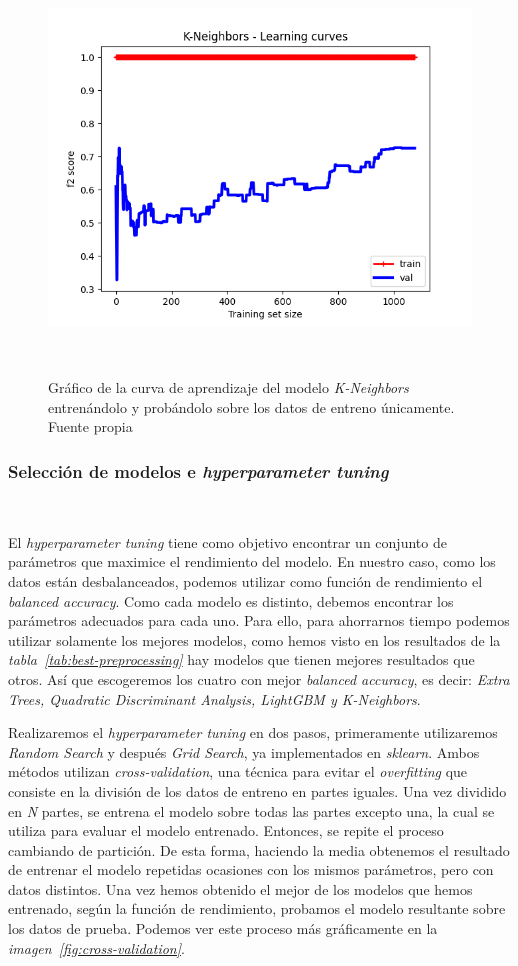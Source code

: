 \begin{figure}[!h]
    \centering
    \includegraphics[width=0.7\linewidth]{media/images/learing-curves-knn.png}
    \caption{Gráfico de la curva de aprendizaje del modelo \textit{K-Neighbors} entrenándolo y probándolo sobre los datos de entreno únicamente. Fuente propia}\ \label{fig:lc-knn}
\end{figure}


\subsubsection{Selección de modelos e \textit{hyperparameter tuning}}\ \label{sec:i1-seleccion}

El \textit{hyperparameter tuning} tiene como objetivo encontrar un conjunto de parámetros que maximice el rendimiento del modelo. 
En nuestro caso, como los datos están desbalanceados, podemos utilizar como función de rendimiento el \textit{balanced accuracy}. 
Como cada modelo es distinto, debemos encontrar los parámetros adecuados para cada uno. 
Para ello, para ahorrarnos tiempo podemos utilizar solamente los mejores modelos, como hemos visto en los resultados de la \textit{tabla\ \ref{tab:best-preprocessing}}
hay modelos que tienen mejores resultados que otros.
Así que escogeremos los cuatro con mejor \textit{balanced accuracy}, es decir: \textit{Extra Trees, Quadratic Discriminant Analysis, LightGBM y K-Neighbors}.

Realizaremos el \textit{hyperparameter tuning} en dos pasos, primeramente utilizaremos \textit{Random Search} y después \textit{Grid Search}, ya implementados en \textit{sklearn}.
Ambos métodos utilizan \textit{cross-validation}, una técnica para evitar el \textit{overfitting} que consiste en la división de los datos de entreno en partes iguales.
Una vez dividido en \textit{N} partes, se entrena el modelo sobre todas las partes excepto una, la cual se utiliza para evaluar el modelo entrenado. Entonces, se repite el 
proceso cambiando de partición. De esta forma, haciendo la media obtenemos el resultado de entrenar el modelo repetidas ocasiones con los mismos parámetros, pero con datos 
distintos. Una vez hemos obtenido el mejor de los modelos que hemos entrenado, según la función de rendimiento, probamos el modelo resultante sobre los datos de prueba.
Podemos ver este proceso más gráficamente en la \textit{imagen\ \ref{fig:cross-validation}}.

